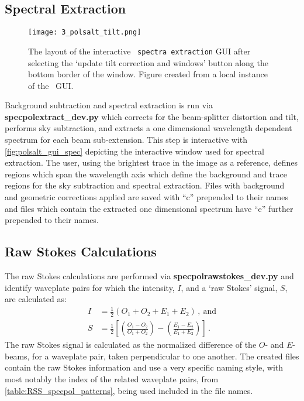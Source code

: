 \subsection{Spectral Extraction}

\begin{figure}[t]
    \centering
    \texttt{[image: 3\_polsalt\_tilt.png]}
    \caption{The layout of the interactive \polsalt\ \texttt{spectra extraction} \gls{GUI} after selecting the `update tilt correction and windows' button along the bottom border of the window. Figure created from a local instance of the \polsalt\ \gls{GUI}.}
    \label{fig:polsalt_gui_spec}
\end{figure}

Background subtraction and spectral extraction is run via \textbf{spec\-pol\-extract\_dev.py} which corrects for the beam-splitter distortion and tilt, performs sky subtraction, and extracts a one dimensional wavelength dependent spectrum for each beam sub-extension. This step is interactive with \autoref{fig:polsalt_gui_spec} depicting the interactive window used for spectral extraction.
The user, using the brightest trace in the image as a reference, defines regions which span the wavelength axis which define the background and trace regions for the sky subtraction and spectral extraction. Files with background and geometric corrections applied are saved with ``c'' prepended to their names and files which contain the extracted one dimensional spectrum have ``e'' further prepended to their names.

\subsection{Raw Stokes Calculations}

The raw Stokes calculations are performed via \textbf{specpolraw\-stokes\_dev.py} and identify waveplate pairs for which the intensity, $I$, and a `raw Stokes' signal, $S$, are calculated as:
\begin{align} \label{eq:polsalt_rawstokes}
    I &= \frac{1}{2} (O_{1} + O_{2} + E_{1} + E_{2})\,,\ \text{and}\\
    S &= \frac{1}{2} \left[ \left( \frac{O_{1} - O_{2}}{O_{1} + O_{2}} \right) - \left( \frac{E_{1} - E_{2}}{E_{1} + E_{2}} \right) \right]\,.
\end{align}
The raw Stokes signal is calculated as the normalized difference of the $O$- and $E$-beams, for a waveplate pair, taken perpendicular to one another. The created files contain the raw Stokes information and use a very specific naming style, with most notably the index of the related waveplate pairs, from \autoref{table:RSS_specpol_patterns}, being used included in the file names.

